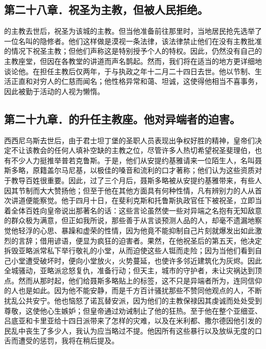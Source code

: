 
\subsection{第二十八章．祝圣为主教，但被人民拒绝。}

的主教去世后，祝圣为该城的主教。但当他准备前往那里时，当地居民抢先选举了一位名叫的隐修者。他们这样做是漠视一条法律，该法律禁止他们在没有主教批准的情况下祝圣主教；但他们声称这是特别授予个人的特权。因此，仍然没有自己的主教座堂，但因在各教堂的讲道而声名鹊起。然而，我们将在适当的地方更详细地谈论他。在担任主教后仅两年，于与执政之年十二月二十四日去世。他以节制、生活正直和对穷人的仁慈而闻名；他性格异常和蔼、坦诚，这使得他相当不喜事务，因此被勤于活动的人视为懒惰。\par


\subsection{第二十九章．的升任主教座。他对异端者的迫害。}

西西尼乌斯去世后，由于君士坦丁堡的圣职人员表现出争权好胜的精神，皇帝们决定不让该教会的任何人填补空缺的主教之位，尽管许多人热切希望祝圣斐理伯，也有不少人力挺推举普若克鲁斯。于是，他们从安提约基雅请来一位陌生人，名叫聂斯多略，原籍盖尔马尼基，以极佳的嗓音和流利的口才著称；他们认为这些资质对于教导百姓很重要。因此，过了三个月后，聂斯多略被从安提约基雅带来，有些人因其节制而大大赞扬他；但至于他在其他方面具有何种性情，凡有辨别力的人从首次讲道便能察觉。他于四月十日，在斐利克斯和托鲁斯执政官任下被祝圣，立即当着全体百姓向皇帝说出那著名的话：这些言论虽然使一些对异端之名抱有无知敌意的群众极为满意，但正如我所说，那些善于从言谈预测人品的人，却毫不遗漏地察觉他轻浮的心思、暴躁和虚荣的性情，因为他竟不能抑制自己片刻就爆发出如此激烈的言辞；借用谚语，便显为疯狂的迫害者。果然，在他祝圣后的第五天，他决定拆毁亚略派常私下举行敬礼的小堂，从而迫使这些人铤而走险；因为当他们看到自己小堂遭受破坏时，便向小堂放火，火势蔓延，也使许多邻近建筑化为灰烬。因此全城骚动，亚略派忿怒复仇，准备行动；但天主，城市的守护者，未让灾祸达到顶点。然而从那时起，他们给聂斯多略贴上的标签，这不只是异端者所为，连同信仰的人也是如此。因为他不能安静，而是千方百计骚扰那些不赞同他观点的人，不断扰乱公共安宁。他也恼怒了诺瓦替安派，因为他们的主教保禄因其虔诚而处处受到尊敬，这使他心生嫉妒；但皇帝通过劝诫制止了他的狂热。至于他在整个亚细亚、吕底亚和卡里亚给十四日派带来了怎样的灾难，以及在米利都、撒尔德因他引发的民乱中丧生了多少人，我认为应当略过不提。他因所有这些暴行以及放纵无度的口舌而遭受的惩罚，我将在稍后提及。\par

